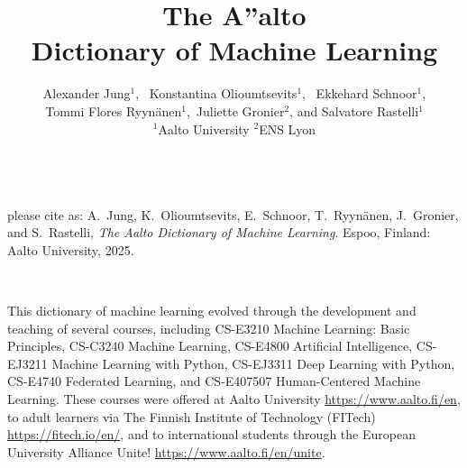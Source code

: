 \documentclass[journal,12pt,onecolumn]{article}
\begin{document}

\title {\vspace*{10mm}
	{\huge {\bf The {\fontsize{40}{48}\selectfont \textbf{\textsf{A\hspace*{-2mm}''}}}\hspace*{-4mm}alto \\ Dictionary of Machine Learning}}  \\[-5mm] 
}


\author{\hspace{-2mm}Alexander Jung${}^{1}$, \ Konstantina Olioumtsevits${}^{1}$, \ Ekkehard Schnoor${}^{1}$, \\[-2mm]
	Tommi Flores Ryynänen${}^{1}$,\ Juliette Gronier${}^{2}$, and Salvatore Rastelli${}^{1}$ \\[-2mm]
	${}^{1}$Aalto University \quad ${}^{2}$ENS Lyon
}

\maketitle
	\begin{center}
		\\[10mm]
{\large	please cite as: A.\ Jung, K.\ Olioumtsevits, E.\ Schnoor, T.\ Ryynänen, J.\ Gronier, and S.\ Rastelli, \textit{The Aalto Dictionary of Machine Learning}. Espoo, Finland: Aalto University, 2025.}
\end{center}

\newpage 
{}\

\noindent This dictionary of machine learning evolved through the development 
and teaching of several courses, including CS-E3210 Machine Learning: Basic Principles, 
CS-C3240 Machine Learning, CS-E4800 Artificial Intelligence, CS-EJ3211 Machine Learning with Python, 
CS-EJ3311 Deep Learning with Python, CS-E4740 Federated Learning, and 
CS-E407507 Human-Centered Machine Learning. These courses were offered at 
Aalto University \url{https://www.aalto.fi/en}, to adult learners via 
The Finnish Institute of Technology (FITech) \url{https://fitech.io/en/}, and to international 
students through the European University Alliance Unite! \url{https://www.aalto.fi/en/unite}.
\end{document}
